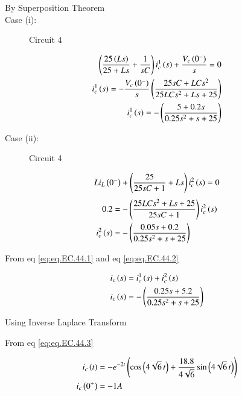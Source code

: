 \documentclass[journal,12pt,twocolumn]{IEEEtran}
\begin{document}
\bigskip

By Superposition Theorem\\
\bigskip
Case (i):
\begin{figure}[ht]
  \centering
  \begin{adjustbox}{width=\columnwidth}
      
  \end{adjustbox}
  \caption{Circuit 4}
\end{figure}

\begin{align}
     \left(\frac{25\left(Ls\right)}{25 + Ls} + \frac{1}{sC}\right)i_{c}^1 \left(s\right) + \frac{V_c \left(0^-\right)}{s} = 0\\
     i_{c}^1\left(s\right) =  -\frac{V_c\left(0^-\right)}{s} \left(\frac{25sC+LCs^2}{25LCs^2 +Ls + 25}\right)\\
     i_{c}^1\left(s\right) =  -\left(\frac{5+0.2 s}{0.25s^2 +s + 25}\right) \label{eq:eq.EC.44.1}
\end{align}

\newpage
Case (ii):

\begin{figure}[ht]
  \centering
  \begin{adjustbox}{width=\columnwidth}
      
  \end{adjustbox}
  \caption{Circuit 4}
\end{figure}

\begin{align}
    Li_L \left(0^-\right) + \left(\frac{25}{25sC + 1} + Ls\right) i_{c}^2 \left(s\right) = 0
\end{align}
\begin{align}
     0.2 &= - \left(\frac{25LCs^2 + Ls + 25}{25sC + 1}\right) i_{c}^2 \left(s\right)\\
    i_{c}^2 \left(s\right) &= -\left(\frac{0.05s + 0.2}{0.25s^2 + s + 25}\right)  \label{eq:eq.EC.44.2}
\end{align}

From eq \eqref{eq:eq.EC.44.1} and eq \eqref{eq:eq.EC.44.2}

\begin{align}
     i_c \left(s\right) &= i_{c}^1 \left(s\right) + i_{c}^2 \left(s\right)\\
     i_c \left(s\right) &= - \left(\frac{0.25s +5.2}{0.25s^2 + s + 25}\right) \label{eq:eq.EC.44.3}
\end{align}

Using Inverse Laplace Transform 

From eq \eqref{eq:eq.EC.44.3}

\begin{align}
    i_{c} \left(t\right) &= - e^{-2t} \left(\cos\left(4\sqrt{6}\, t\right) + \frac{18.8}{4\sqrt{6}}\sin{\ensuremath{\left(4\sqrt{6}\, t\right)}}\right)\\
    i_{c} \left(0^+\right) &=-1A 
\end{align}
\end{document}

